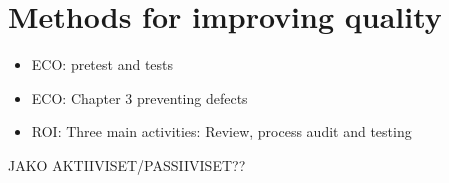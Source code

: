 
 \section{Methods for improving quality}
 
 \begin{itemize}
 
 \item ECO: pretest and tests
 
 \item ECO: Chapter 3 preventing defects 
 
 \item ROI: Three main activities: Review, process audit and testing
 
 \end{itemize}

JAKO AKTIIVISET/PASSIIVISET??
 



 

 


